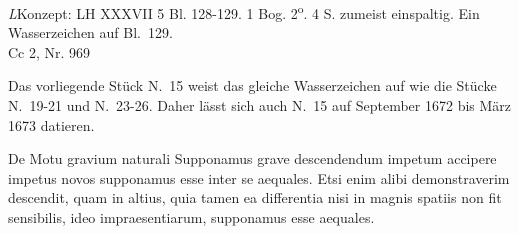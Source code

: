 \begin{Ueberlieferung}%
{\textit{L}}Konzept: LH XXXVII 5 Bl. 128-129. 1 Bog. 2\textsuperscript{o}. 4 S. zumeist einspaltig. Ein Wasserzeichen auf Bl.~129.\\%
Cc 2, Nr. 969
\end{Ueberlieferung}
%
\begin{Datierungsgruende}%
Das vorliegende Stück N.~15 %
weist das gleiche Wasserzeichen auf
wie die Stücke N.~19-21 und N.~23-26. %
Daher lässt sich auch N.~15 %
auf September 1672 bis März 1673 datieren.
\end{Datierungsgruende}
%
\count{}
\count{}
\count{}
\pstartfirst%
[128~r\textsuperscript{o}]
\pend
\pstart
\centering%
De Motu gravium\protect{} %
naturali%
%
\pend
\vspace{1em}
\pstart 
\noindent%
Supponamus grave\protect{}
descendendum impetum\protect{} accipere  impetus\protect{} novos supponamus esse inter se aequales. Etsi enim alibi demonstraverim   descendit, quam in altius, quia tamen ea differentia nisi in magnis spatiis non fit sensibilis, ideo impraesentiarum, supponamus esse aequales.
\pend 
\pstart 
